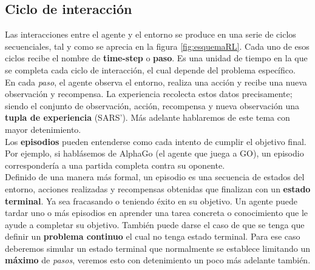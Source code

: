 \documentclass[11pt,fleqn]{book} %
\begin{document}

\subsection{Ciclo de interacción}\label{sec:episodios}


Las interacciones entre el agente y el entorno se produce en una serie de ciclos secuenciales, tal y como se aprecia en la figura \ref{fig:esquemaRL}. Cada uno de esos ciclos recibe el nombre de \textbf{time-step} o \textbf{paso}. Es una unidad de tiempo en la que se completa cada ciclo de interacción, el cual depende del problema específico. \\

En cada \textit{paso}, el agente observa el entorno, realiza una acción y recibe una nueva observación y recompensa. La experiencia recolecta estos datos precisamente; siendo el conjunto de observación, acción, recompensa y nueva observación una \textbf{tupla de experiencia} (SARS'). Más adelante hablaremos de este tema con mayor detenimiento. \\

Los \textbf{episodios} pueden entenderse como cada intento de cumplir el objetivo final. Por ejemplo, si hablásemos de AlphaGo (el agente que juega a GO), un episodio correspondería a una partida completa contra su oponente. \\

Definido de una manera más formal, un episodio es una secuencia de estados del entorno, acciones realizadas y recompensas obtenidas que finalizan con un \textbf{estado terminal}. Ya sea fracasando o teniendo éxito en su objetivo. Un agente puede tardar uno o más episodios en aprender una tarea concreta o conocimiento que le ayude a completar su objetivo. También puede darse el caso de que se tenga que definir un \textbf{problema continuo} el cual no tenga estado terminal. Para ese caso deberemos simular un estado terminal que normalmente se establece limitando un \textbf{máximo} de \textit{pasos}, veremos esto con detenimiento un poco más adelante también. \\
\end{document}
